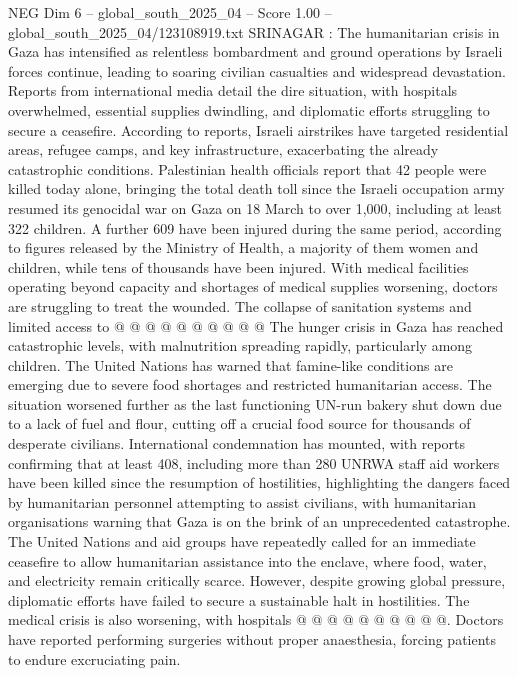 \begin{textsample}{NEG Dim 6 – global\_south\_2025\_04 – Score 1.00 – global\_south\_2025\_04/123108919.txt}  \label{ex:f6_neg_212}
SRINAGAR : The humanitarian crisis in Gaza has intensified as relentless bombardment and ground operations by Israeli forces continue, leading to soaring civilian casualties and widespread devastation.
Reports from international media detail the dire situation, with hospitals overwhelmed, essential supplies dwindling, and diplomatic efforts struggling to secure a ceasefire.
According to reports, Israeli airstrikes have targeted residential areas, refugee camps, and key infrastructure, exacerbating the already catastrophic conditions.
Palestinian health officials report that 42 people were killed today alone, bringing the total death toll since the Israeli occupation army resumed its genocidal war on Gaza on 18 March to over 1,000, including at least 322 children.
A further 609 have been injured during the same period, according to figures released by the Ministry of Health, a majority of them women and children, while tens of thousands have been injured.
With medical facilities operating beyond capacity and shortages of medical supplies worsening, doctors are struggling to treat the wounded.
The collapse of sanitation systems and limited access to @ @ @ @ @ @ @ @ @ @ The hunger crisis in Gaza has reached catastrophic levels, with malnutrition spreading rapidly, particularly among children.
The United Nations has warned that famine-like conditions are emerging due to severe food shortages and restricted humanitarian access.
The situation worsened further as the last functioning UN-run bakery shut down due to a lack of fuel and flour, cutting off a crucial food source for thousands of desperate civilians.
International condemnation has mounted, with reports confirming that at least 408, including more than 280 UNRWA staff aid workers have been killed since the resumption of hostilities, highlighting the dangers faced by humanitarian personnel attempting to assist civilians, with humanitarian organisations warning that Gaza is on the brink of an unprecedented catastrophe.
The United Nations and aid groups have repeatedly called for an immediate ceasefire to allow humanitarian assistance into the enclave, where food, water, and electricity remain critically scarce.
However, despite growing global pressure, diplomatic efforts have failed to secure a sustainable halt in hostilities.
The medical crisis is also worsening, with hospitals @ @ @ @ @ @ @ @ @ @.
Doctors have reported performing surgeries without proper anaesthesia, forcing patients to endure excruciating pain.

\end{textsample}
